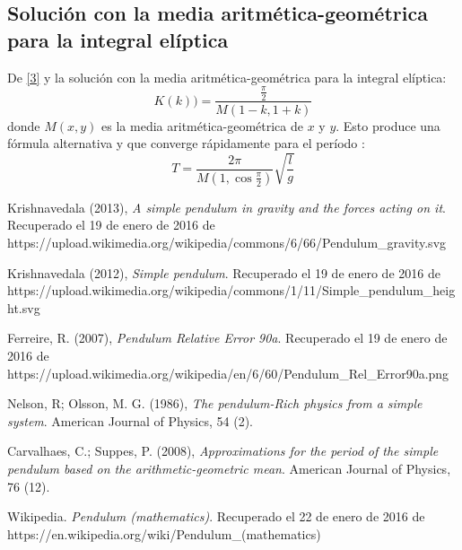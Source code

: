 \documentclass[12pt]{article}
\begin{document}
\subsection{Solución con la media aritmética-geométrica para la integral elíptica}

De \eqref{3} y la solución con la media aritmética-geométrica para la integral elíptica:
\begin{equation}
K(k))=\frac{\frac{\pi}{2}}{M(1-k,1+k)}
\end{equation}
donde $M(x,y)$ es la media aritmética-geométrica de $x$ y $y$. Esto produce una fórmula alternativa y que converge rápidamente para el período \cite{5}:
\begin{equation}
T=\frac{2\pi}{M(1,\cos{\frac{\pi}{2}})}\sqrt{\frac{l}{g}}
\end{equation}

\pagebreak

\begin{thebibliography}{6}

Krishnavedala (2013),
\emph{A simple pendulum in gravity and the forces acting on it}. Recuperado el 19 de enero de 2016 de https://upload.wikimedia.org/wikipedia/commons/6/66/Pendulum\_gravity.svg 

Krishnavedala (2012),
\emph{Simple pendulum}. Recuperado el 19 de enero de 2016 de https://upload.wikimedia.org/wikipedia/commons/1/11/Simple\_pendulum\_height.svg 

Ferreire, R. (2007),
\emph{Pendulum Relative Error 90a}. Recuperado el 19 de enero de 2016 de https://upload.wikimedia.org/wikipedia/en/6/60/Pendulum\_Rel\_Error90a.png 

Nelson, R; Olsson, M. G. (1986),
\emph{The pendulum-Rich physics from a simple system}.
American Journal of Physics,
54 (2).

Carvalhaes, C.; Suppes, P. (2008), \emph{Approximations for the period of the simple pendulum based on the arithmetic-geometric mean}. 
American Journal of Physics,
76 (12).

Wikipedia.
\emph{Pendulum (mathematics)}.
Recuperado el 22 de enero de 2016 de https://en.wikipedia.org/wiki/Pendulum\_(mathematics)
\end{thebibliography}
\end{document}
